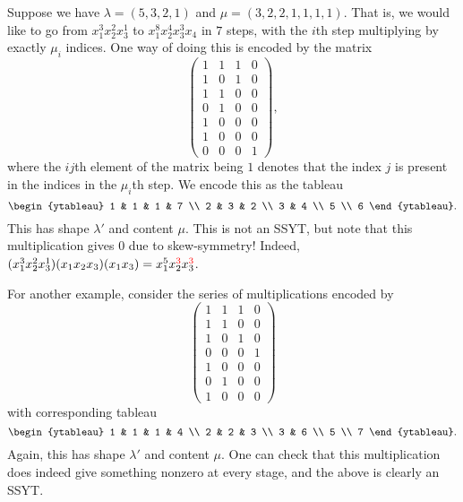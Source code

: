 	\begin{fex}
		Suppose we have $\lambda = (5,3,2,1)$ and $\mu = (3,2,2,1,1,1,1)$. That is, we would like to go from $x_1^3x_2^2x_3^1$ to $x_1^8x_2^4x_3^3x_4$ in $7$ steps, with the $i$th step multiplying by exactly $\mu_i$ indices. One way of doing this is encoded by the matrix
		\[ 
		\begin{pmatrix}
		 	1 & 1 & 1 & 0 \\
		 	1 & 0 & 1 & 0 \\
		 	1 & 1 & 0 & 0 \\
		 	0 & 1 & 0 & 0 \\
		 	1 & 0 & 0 & 0 \\
		 	1 & 0 & 0 & 0 \\
		 	0 & 0 & 0 & 1
		\end{pmatrix},
		\]
		where the $ij$th element of the matrix being $1$ denotes that the index $j$ is present in the indices in the $\mu_i$th step.
		We encode this as the tableau
		\[ \begin{ytableau} 1 & 1 & 1 & 7 \\ 2 & 3 & 2 \\ 3 & 4 \\ 5 \\ 6 \end{ytableau}. \]
		This has shape $\lambda'$ and content $\mu$. This is not an SSYT, but note that this multiplication gives $0$ due to skew-symmetry! Indeed, $(x_1^3x_2^2x_3^1)(x_1x_2x_3)(x_1x_3) = x_1^5x_2^{\textcolor{red}{3}}x_3^{\textcolor{red}{3}}$.

		For another example, consider the series of multiplications encoded by
		\[
		\begin{pmatrix}
			1 & 1 & 1 & 0 \\
			1 & 1 & 0 & 0 \\
			1 & 0 & 1 & 0 \\
			0 & 0 & 0 & 1 \\
			1 & 0 & 0 & 0 \\
			0 & 1 & 0 & 0 \\
			1 & 0 & 0 & 0
		\end{pmatrix}
		\]
		with corresponding tableau
		\[
		\begin{ytableau}
			1 & 1 & 1 & 4 \\ 2 & 2 & 3 \\ 3 & 6 \\ 5 \\ 7
		\end{ytableau}.
		\]
		Again, this has shape $\lambda'$ and content $\mu$. One can check that this multiplication does indeed give something nonzero at every stage, and the above is clearly an SSYT.
	\end{fex}

